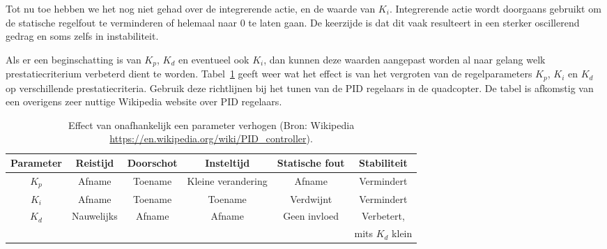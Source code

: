 \documentclass[a4paper,11pt]{article}
\begin{document}
Tot nu toe hebben we het nog niet gehad over de integrerende actie, en de
waarde van $K_i$. Integrerende actie wordt doorgaans gebruikt om de statische
regelfout te verminderen of helemaal naar 0 te laten gaan. De keerzijde is dat
dit vaak resulteert in een sterker oscillerend gedrag en soms zelfs in
instabiliteit.

Als er een beginschatting is van $K_p$, $K_d$ en eventueel ook $K_i$, dan
kunnen deze waarden aangepast worden al naar gelang welk prestatiecriterium
verbeterd dient te worden. Tabel~\ref{tab:effect} geeft weer wat het effect is
van het vergroten van de regelparameters $K_p$, $K_i$ en $K_d$ op
verschillende prestatiecriteria. Gebruik deze richtlijnen bij het tunen van de
PID regelaars in de quadcopter. De tabel is afkomstig van een overigens zeer nuttige
Wikipedia website over PID regelaars.
\begin{table}
  \centering
  \caption{Effect van onafhankelijk een parameter verhogen (Bron: Wikipedia
  \url{https://en.wikipedia.org/wiki/PID_controller}).}
  \label{tab:effect}
  \begin{tabular}{c|ccccc}
    \hline\hline
    Parameter & Reistijd  & Doorschot & Insteltijd & Statische fout &
    Stabiliteit\\
    \hline
    $K_p$ & Afname & Toename & Kleine verandering & Afname & Vermindert\\
    $K_i$ & Afname & Toename & Toename & Verdwijnt & Vermindert \\
    $K_d$ & Nauwelijks & Afname & Afname & Geen invloed & Verbetert,\\  & & &
          & & mits $K_d$ klein\\
\hline\hline
  \end{tabular}
\end{table}
\end{document}
